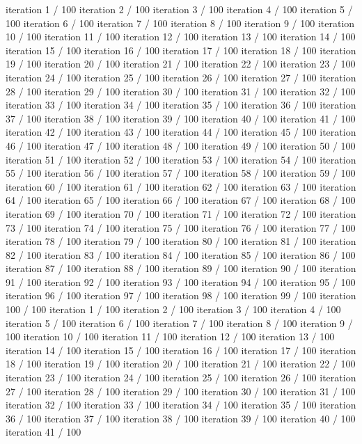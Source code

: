 iteration 1 / 100 iteration 2 / 100 iteration 3 / 100 iteration 4 / 100
iteration 5 / 100 iteration 6 / 100 iteration 7 / 100 iteration 8 / 100
iteration 9 / 100 iteration 10 / 100 iteration 11 / 100 iteration 12 /
100 iteration 13 / 100 iteration 14 / 100 iteration 15 / 100 iteration
16 / 100 iteration 17 / 100 iteration 18 / 100 iteration 19 / 100
iteration 20 / 100 iteration 21 / 100 iteration 22 / 100 iteration 23 /
100 iteration 24 / 100 iteration 25 / 100 iteration 26 / 100 iteration
27 / 100 iteration 28 / 100 iteration 29 / 100 iteration 30 / 100
iteration 31 / 100 iteration 32 / 100 iteration 33 / 100 iteration 34 /
100 iteration 35 / 100 iteration 36 / 100 iteration 37 / 100 iteration
38 / 100 iteration 39 / 100 iteration 40 / 100 iteration 41 / 100
iteration 42 / 100 iteration 43 / 100 iteration 44 / 100 iteration 45 /
100 iteration 46 / 100 iteration 47 / 100 iteration 48 / 100 iteration
49 / 100 iteration 50 / 100 iteration 51 / 100 iteration 52 / 100
iteration 53 / 100 iteration 54 / 100 iteration 55 / 100 iteration 56 /
100 iteration 57 / 100 iteration 58 / 100 iteration 59 / 100 iteration
60 / 100 iteration 61 / 100 iteration 62 / 100 iteration 63 / 100
iteration 64 / 100 iteration 65 / 100 iteration 66 / 100 iteration 67 /
100 iteration 68 / 100 iteration 69 / 100 iteration 70 / 100 iteration
71 / 100 iteration 72 / 100 iteration 73 / 100 iteration 74 / 100
iteration 75 / 100 iteration 76 / 100 iteration 77 / 100 iteration 78 /
100 iteration 79 / 100 iteration 80 / 100 iteration 81 / 100 iteration
82 / 100 iteration 83 / 100 iteration 84 / 100 iteration 85 / 100
iteration 86 / 100 iteration 87 / 100 iteration 88 / 100 iteration 89 /
100 iteration 90 / 100 iteration 91 / 100 iteration 92 / 100 iteration
93 / 100 iteration 94 / 100 iteration 95 / 100 iteration 96 / 100
iteration 97 / 100 iteration 98 / 100 iteration 99 / 100 iteration 100 /
100 iteration 1 / 100 iteration 2 / 100 iteration 3 / 100 iteration 4 /
100 iteration 5 / 100 iteration 6 / 100 iteration 7 / 100 iteration 8 /
100 iteration 9 / 100 iteration 10 / 100 iteration 11 / 100 iteration 12
/ 100 iteration 13 / 100 iteration 14 / 100 iteration 15 / 100 iteration
16 / 100 iteration 17 / 100 iteration 18 / 100 iteration 19 / 100
iteration 20 / 100 iteration 21 / 100 iteration 22 / 100 iteration 23 /
100 iteration 24 / 100 iteration 25 / 100 iteration 26 / 100 iteration
27 / 100 iteration 28 / 100 iteration 29 / 100 iteration 30 / 100
iteration 31 / 100 iteration 32 / 100 iteration 33 / 100 iteration 34 /
100 iteration 35 / 100 iteration 36 / 100 iteration 37 / 100 iteration
38 / 100 iteration 39 / 100 iteration 40 / 100 iteration 41 / 100
